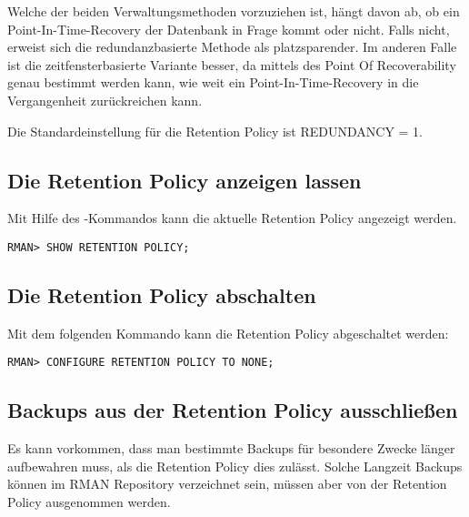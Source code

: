         Welche der beiden Verwaltungsmethoden vorzuziehen ist, hängt davon ab, ob ein Point-In-Time-Recovery der Datenbank in Frage kommt oder nicht. Falls nicht, erweist sich die redundanzbasierte Methode als platzsparender. Im anderen Falle ist die zeitfensterbasierte Variante besser, da mittels des Point Of Recoverability genau bestimmt werden kann, wie weit ein Point-In-Time-Recovery in die Vergangenheit zurückreichen kann.
        \begin{merke}
          Die Standardeinstellung für die Retention Policy ist REDUNDANCY = 1.
        \end{merke}
\clearpage
			\subsection{Die Retention Policy anzeigen lassen}
        Mit Hilfe des -Kommandos kann die aktuelle Retention Policy angezeigt werden.
        \begin{lstlisting}[caption={Anzeigen der Retention Policy},label=admin1027,language=rman]
RMAN> SHOW RETENTION POLICY;
        \end{lstlisting}
      \subsection{Die Retention Policy abschalten}
        Mit dem folgenden Kommando kann die Retention Policy abgeschaltet werden:
        \begin{lstlisting}[caption={Abschalten der Retention Policy},label=admin1028,language=rman]
RMAN> CONFIGURE RETENTION POLICY TO NONE;
        \end{lstlisting}
      \subsection{Backups aus der Retention Policy ausschließen}
        Es kann vorkommen, dass man bestimmte Backups für besondere Zwecke länger aufbewahren muss, als die Retention Policy dies zulässt. Solche Langzeit Backups können im RMAN Repository verzeichnet sein, müssen aber von der Retention Policy ausgenommen werden.

